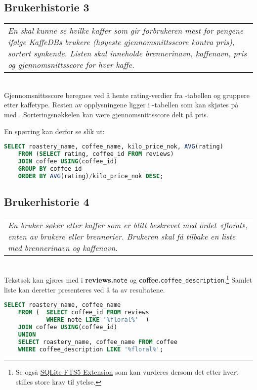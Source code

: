 \subsection{Brukerhistorie 3}

\begin{tabular}{ | p{} }
    \textsl{En skal kunne se hvilke kaffer som gir forbrukeren mest for pengene ifølge KaffeDBs brukere (høyeste gjennomsnittsscore kontra pris), sortert synkende.
    Listen skal inneholde brennerinavn, kaffenavn, pris og gjennomsnittsscore for hver kaffe.}
\end{tabular} \\

Gjennomsnittsscore beregnes ved å hente rating-verdier fra -tabellen og gruppere etter kaffetype.
Resten av opplysningene ligger i -tabellen som kan skjøtes på med .
Sorteringsnøkkelen kan være gjennomsnittsscore delt på pris.

En spørring kan derfor se slik ut: \\

\begin{lstlisting}[language=SQL]
    SELECT roastery_name, coffee_name, kilo_price_nok, AVG(rating)
    FROM (SELECT rating, coffee_id FROM reviews)
    JOIN coffee USING(coffee_id)
    GROUP BY coffee_id
    ORDER BY AVG(rating)/kilo_price_nok DESC;
\end{lstlisting}

\subsection{Brukerhistorie 4}

\begin{tabular}{ | p{} }
    \textsl{En bruker søker etter kaffer som er blitt beskrevet med ordet «floral», enten av brukere eller brennerier.
    Brukeren skal få tilbake en liste med brennerinavn og kaffenavn.}
\end{tabular} \\

Tekstsøk kan gjøres med  i \textbf{reviews.}\verb|note| og \textbf{coffee.}\verb|coffee_description|.\footnote{ Se også \href{https://www.sqlite.org/fts5.html}{SQLite FTS5 Extension} som kan vurderes dersom det etter hvert stilles store krav til ytelse.}
Samlet liste kan deretter presenteres ved å ta  av resultatene. \\

\begin{lstlisting}[language=SQL]
    SELECT roastery_name, coffee_name
    FROM (  SELECT coffee_id FROM reviews
            WHERE note LIKE '%floral%'  )
    JOIN coffee USING(coffee_id)
    UNION
    SELECT roastery_name, coffee_name FROM coffee
    WHERE coffee_description LIKE '%floral%';
\end{lstlisting}

